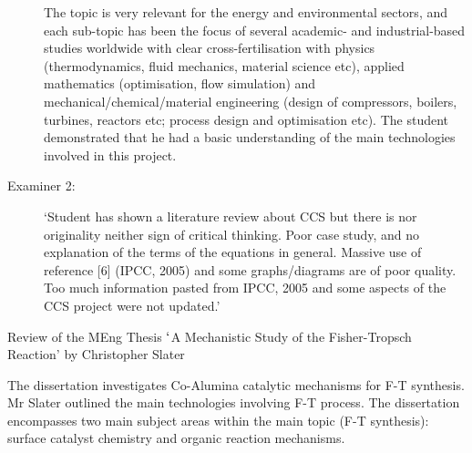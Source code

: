 \documentclass[14pt,twoside]{report}
\begin{document}
\begin{description}
The topic is very relevant for the energy and environmental sectors, and each sub-topic has been the focus of several academic- and industrial-based studies worldwide with clear cross-fertilisation with physics (thermodynamics, fluid mechanics, material science etc), applied mathematics (optimisation, flow simulation) and mechanical/chemical/material engineering (design of compressors, boilers, turbines, reactors etc; process design and optimisation etc). The student demonstrated that he had a basic understanding of the main technologies involved in this project.

\item[Examiner 2:] `Student has shown a literature review about CCS but there is nor originality neither sign of critical thinking. Poor case study, and no explanation of the terms of the equations in general. Massive use of reference [6] (IPCC, 2005) and some graphs/diagrams are of poor quality. Too much information pasted from IPCC, 2005 and some aspects of the CCS project were not updated.'

\end{description}

\clearpage



\bigskip

\begin{center}
  {\Large Review of the MEng Thesis $\lq$A Mechanistic Study of the Fisher-Tropsch Reaction' by Christopher Slater}
\end{center}

The dissertation investigates Co-Alumina catalytic mechanisms for F-T synthesis. Mr Slater outlined the main technologies involving F-T process. The dissertation encompasses two main subject areas within the main topic (F-T synthesis): surface catalyst chemistry and organic reaction mechanisms. 
\end{document}
